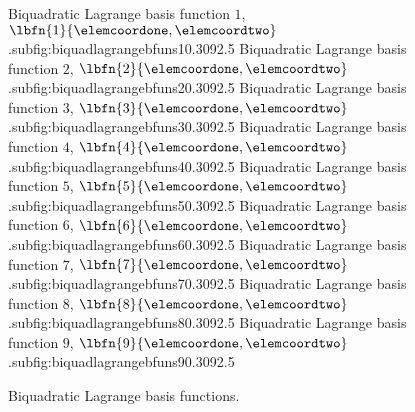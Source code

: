 \begin{figure}[hbtp]
   \centering
     {Biquadratic Lagrange basis function $1$, $\lbfn{1}{\elemcoordone,\elemcoordtwo}$.}{subfig:biquadlagrangebfuns1}{0.30\linewidth}{9}{2.5}{}
   \hfil
     {Biquadratic Lagrange basis function $2$, $\lbfn{2}{\elemcoordone,\elemcoordtwo}$.}{subfig:biquadlagrangebfuns2}{0.30\linewidth}{9}{2.5}{}
   \hfil
     {Biquadratic Lagrange basis function $3$, $\lbfn{3}{\elemcoordone,\elemcoordtwo}$.}{subfig:biquadlagrangebfuns3}{0.30\linewidth}{9}{2.5}{}
     {Biquadratic Lagrange basis function $4$, $\lbfn{4}{\elemcoordone,\elemcoordtwo}$.}{subfig:biquadlagrangebfuns4}{0.30\linewidth}{9}{2.5}{}
   \hfil
     {Biquadratic Lagrange basis function $5$, $\lbfn{5}{\elemcoordone,\elemcoordtwo}$.}{subfig:biquadlagrangebfuns5}{0.30\linewidth}{9}{2.5}{}
   \hfil
     {Biquadratic Lagrange basis function $6$, $\lbfn{6}{\elemcoordone,\elemcoordtwo}$.}{subfig:biquadlagrangebfuns6}{0.30\linewidth}{9}{2.5}{}
     {Biquadratic Lagrange basis function $7$, $\lbfn{7}{\elemcoordone,\elemcoordtwo}$.}{subfig:biquadlagrangebfuns7}{0.30\linewidth}{9}{2.5}{}
   \hfil
     {Biquadratic Lagrange basis function $8$, $\lbfn{8}{\elemcoordone,\elemcoordtwo}$.}{subfig:biquadlagrangebfuns8}{0.30\linewidth}{9}{2.5}{}
   \hfil
     {Biquadratic Lagrange basis function $9$, $\lbfn{9}{\elemcoordone,\elemcoordtwo}$.}{subfig:biquadlagrangebfuns9}{0.30\linewidth}{9}{2.5}{}
   \caption[Biquadratic Lagrange basis functions.]{Biquadratic Lagrange basis functions.}
   \label{fig:biquadlagrangebfuns}
\end{figure}



